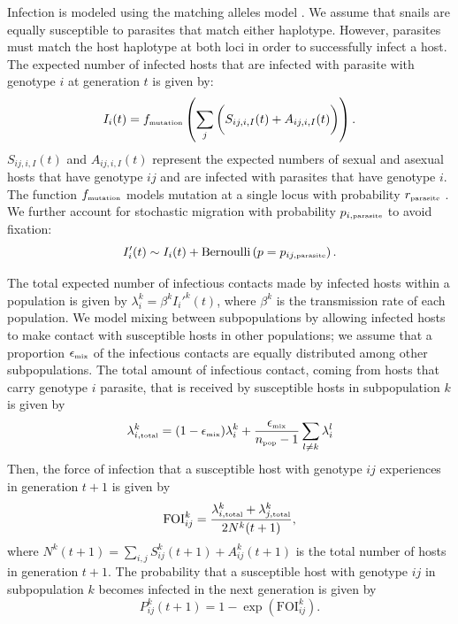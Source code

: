 \documentclass{article}\usepackage[]{graphicx}\usepackage[]{color}
\begin{document}
Infection is modeled using the matching alleles model \citep{hamilton1980sex, frank1997recognition, otto1998evolution}.
We assume that snails are equally susceptible to parasites that match either haplotype.
However, parasites must match the host haplotype at both loci in order to successfully infect a host.
The expected number of infected hosts that are infected with parasite with genotype $i$ at generation $t$ is given by:
\begin{equation}
I_{i}(t) = f_{\textrm{\tiny mutation}} \left( \sum_{j}  \bigg( S_{ij,i,I}(t) + A_{ij,i,I}(t)\bigg)\right).
\end{equation}
$S_{ij,i,I}(t)$ and $A_{ij,i,I}(t)$ represent the expected numbers of sexual and asexual hosts that have genotype $ij$ and are infected with parasites that have genotype $i$.
The function $f_{\textrm{\tiny mutation}}$ models mutation at a single locus with probability $r_{\textrm{\tiny parasite}}$ \citep{ashby2015diversity}. 
We further account for stochastic migration with probability $p_{i, \textrm{\tiny parasite}}$ to avoid fixation:
\begin{equation}
I_{i}'(t) \sim I_i(t) + \mathrm{Bernoulli}\left(p=p_{ij, \textrm{\tiny parasite}}\right).
\end{equation}

The total expected number of infectious contacts made by infected hosts within a population is given by $\lambda_i^k = \beta^k {I_i'}^k(t)$, where $\beta^k$ is the transmission rate of each population. 
We model mixing between subpopulations by allowing infected hosts to make contact with susceptible hosts in other populations;
we assume that a proportion $\epsilon_{\textrm{\tiny mix}}$ of the infectious contacts are equally distributed among other subpopulations.
The total amount of infectious contact, coming from hosts that carry genotype $i$ parasite, that is received by susceptible hosts in subpopulation $k$ is given by
\begin{equation}
\lambda_{i, \textrm{\tiny total}}^k = (1 - \epsilon_{\textrm{\tiny mix}}) \lambda_i^k + \frac{\epsilon_{\textrm{\tiny mix}}}{n_\textrm{\tiny pop}-1} \sum_{l \neq k} \lambda_i^l
\end{equation}
Then, the force of infection that a susceptible host with genotype $ij$ experiences in generation $t+1$ is given by
\begin{equation}
\mathrm{FOI}_{ij}^k = \frac{\lambda_{i, \textrm{\tiny total}}^k  + \lambda_{j, \textrm{\tiny total}}^k}{2 N^k(t+1)},
\end{equation}
where $N^k(t+1) = \sum_{i,j} S_{ij}^k(t+1) + A_{ij}^k(t+1)$ is the total number of hosts in generation $t+1$.
The probability that a susceptible host with genotype $ij$ in subpopulation $k$ becomes infected in the next generation is given by
\begin{equation}
P_{ij}^k(t+1) = 1 - \exp\left(\mathrm{FOI}_{ij}^k\right).
\end{equation}
\end{document}

